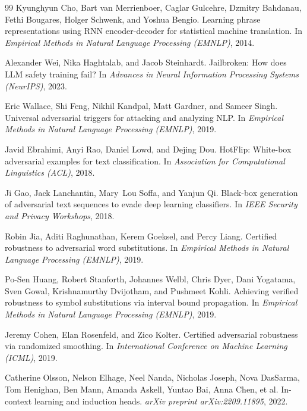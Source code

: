 \documentclass[10pt,twocolumn]{article}
\begin{document}
\begin{thebibliography}{99}
Kyunghyun Cho, Bart van Merrienboer, Caglar Gulcehre, Dzmitry Bahdanau, Fethi Bougares, Holger Schwenk, and Yoshua Bengio.
\newblock Learning phrase representations using RNN encoder-decoder for statistical machine translation.
\newblock In \emph{Empirical Methods in Natural Language Processing (EMNLP)}, 2014.

Alexander Wei, Nika Haghtalab, and Jacob Steinhardt.
\newblock Jailbroken: How does LLM safety training fail?
\newblock In \emph{Advances in Neural Information Processing Systems (NeurIPS)}, 2023.

Eric Wallace, Shi Feng, Nikhil Kandpal, Matt Gardner, and Sameer Singh.
\newblock Universal adversarial triggers for attacking and analyzing NLP.
\newblock In \emph{Empirical Methods in Natural Language Processing (EMNLP)}, 2019.

Javid Ebrahimi, Anyi Rao, Daniel Lowd, and Dejing Dou.
\newblock HotFlip: White-box adversarial examples for text classification.
\newblock In \emph{Association for Computational Linguistics (ACL)}, 2018.

Ji Gao, Jack Lanchantin, Mary~Lou Soffa, and Yanjun Qi.
\newblock Black-box generation of adversarial text sequences to evade deep learning classifiers.
\newblock In \emph{IEEE Security and Privacy Workshops}, 2018.

Robin Jia, Aditi Raghunathan, Kerem Goeksel, and Percy Liang.
\newblock Certified robustness to adversarial word substitutions.
\newblock In \emph{Empirical Methods in Natural Language Processing (EMNLP)}, 2019.

Po-Sen Huang, Robert Stanforth, Johannes Welbl, Chris Dyer, Dani Yogatama, Sven Gowal, Krishnamurthy Dvijotham, and Pushmeet Kohli.
\newblock Achieving verified robustness to symbol substitutions via interval bound propagation.
\newblock In \emph{Empirical Methods in Natural Language Processing (EMNLP)}, 2019.

Jeremy Cohen, Elan Rosenfeld, and Zico Kolter.
\newblock Certified adversarial robustness via randomized smoothing.
\newblock In \emph{International Conference on Machine Learning (ICML)}, 2019.

Catherine Olsson, Nelson Elhage, Neel Nanda, Nicholas Joseph, Nova DasSarma, Tom Henighan, Ben Mann, Amanda Askell, Yuntao Bai, Anna Chen, et al.
\newblock In-context learning and induction heads.
\newblock \emph{arXiv preprint arXiv:2209.11895}, 2022.


\end{thebibliography}
\end{document}
